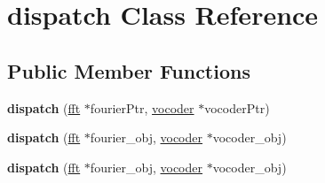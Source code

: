 \hypertarget{classdispatch}{\section{dispatch Class Reference}
\label{classdispatch}
}
\subsection*{Public Member Functions}
\begin{DoxyCompactItemize}
\item 
\hypertarget{classdispatch_a641ec1136a8fdecb8b9ab51fa672a848}{{\bfseries dispatch} (\hyperlink{classfft}{fft} $\ast$fourier\-Ptr, \hyperlink{classvocoder}{vocoder} $\ast$vocoder\-Ptr)}\label{classdispatch_a641ec1136a8fdecb8b9ab51fa672a848}

\item 
\hypertarget{classdispatch_a49638cdbc0fee44e411973f09fc64d83}{{\bfseries dispatch} (\hyperlink{classfft}{fft} $\ast$fourier\-\_\-obj, \hyperlink{classvocoder}{vocoder} $\ast$vocoder\-\_\-obj)}\label{classdispatch_a49638cdbc0fee44e411973f09fc64d83}

\item 
\hypertarget{classdispatch_a49638cdbc0fee44e411973f09fc64d83}{{\bfseries dispatch} (\hyperlink{classfft}{fft} $\ast$fourier\-\_\-obj, \hyperlink{classvocoder}{vocoder} $\ast$vocoder\-\_\-obj)}\label{classdispatch_a49638cdbc0fee44e411973f09fc64d83}

\end{DoxyCompactItemize}
